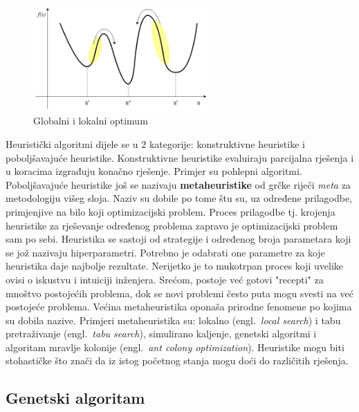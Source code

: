\documentclass[times, utf8, diplomski]{fer}
\begin{document}
\begin{figure}[htb]
	\centering
	\includegraphics[width=0.6\textwidth]{img/optimum.png}
	\caption{Globalni i lokalni optimum}
	\label{fig:optimum}
\end{figure}

Heuristički algoritmi dijele se u $2$ kategorije: konstruktivne heuristike i poboljšavajuće heuristike. Konstruktivne heuristike evaluiraju parcijalna rješenja i u koracima izgrađuju konačno rješenje. Primjer su pohlepni algoritmi. Poboljšavajuće heuristike još se nazivaju \textbf{metaheuristike} od grčke riječi \textit{meta} za metodologiju višeg sloja. Naziv su dobile po tome štu su, uz određene prilagodbe, primjenjive na bilo koji optimizacijski problem. Proces prilagodbe tj. krojenja heuristike za rješevanje određenog problema zapravo je optimizacijski problem sam po sebi. Heuristika se sastoji od strategije i određenog broja parametara koji se jož nazivaju hiperparametri. Potrebno je odabrati one parametre za koje heuristika daje najbolje rezultate. Nerijetko je to mukotrpan proces koji uvelike ovisi o iskustvu i intuiciji inženjera. Srećom, postoje već gotovi "recepti" za mnoštvo postojećih problema, dok se novi problemi često puta mogu svesti na već postojeće problema. Većina metaheuristika oponaša prirodne fenomene po kojima su dobila nazive. Primjeri metaheuristika su: lokalno (engl.~\textit{local search}) i tabu pretraživanje (engl.~\textit{tabu search}), simulirano kaljenje, genetski algoritmi i algoritam mravlje kolonije (engl.~\textit{ant colony optimization}). Heuristike mogu biti stohastičke što znači da iz istog početnog stanja mogu doći do različitih rješenja.

\subsection{Genetski algoritam}
\end{document}

